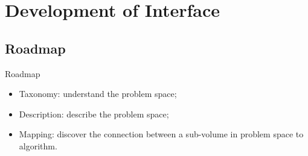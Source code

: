 \documentclass[10pt]{beamer}
\begin{document}
\section{Development of Interface}

\subsection{Roadmap}
\begin{frame}{Roadmap}

\begin{itemize}
\item Taxonomy: understand the problem space;
\item Description: describe the problem space;
\item Mapping: discover the connection between a sub-volume in problem space to algorithm.
\end{itemize}

\end{frame}

\end{document}
